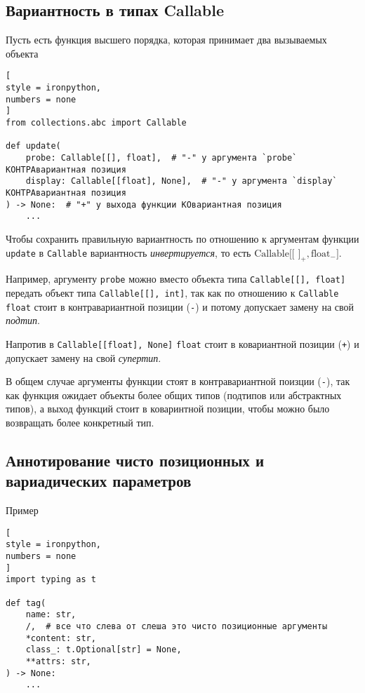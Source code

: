 \documentclass[%
	11pt,
	a4paper,
	utf8,
		]{article}
\begin{document}
\subsection{Вариантность в типах Callable}

Пусть есть функция высшего порядка, которая принимает два вызываемых объекта
\begin{lstlisting}[
style = ironpython,
numbers = none
]
from collections.abc import Callable

def update(
    probe: Callable[[], float],  # "-" у аргумента `probe` КОНТРАвариантная позиция
    display: Callable[[float], None],  # "-" у аргумента `display` КОНТРАвариантная позиция
) -> None:  # "+" у выхода функции КОвариантная позиция
    ...
\end{lstlisting}

Чтобы сохранить правильную вариантность по отношению к аргументам функции \verb*|update| в \verb*|Callable| вариантность \emph{инвертируется}, то есть $\text{Callable[[\ ]}_+, \text{float}_{-}]$.

Например, аргументу \verb*|probe| можно вместо объекта типа \verb|Callable[[], float]| передать объект типа \verb|Callable[[], int]|, так как по отношению к \verb*|Callable| \verb*|float| стоит в контравариантной позиции (\texttt{-}) и потому допускает замену на свой \emph{подтип}.

Напротив в \verb|Callable[[float], None]| \verb*|float| стоит в ковариантной позиции (\texttt{+}) и допускает замену на свой \emph{супертип}.

В общем случае аргументы функции стоят в контравариантной поизции (\texttt{-}), так как функция ожидает объекты более общих типов (подтипов или абстрактных типов), а выход функций стоит в коваринтной позиции, чтобы можно было возвращать более конкретный тип.

\subsection{Аннотирование чисто позиционных и вариадических параметров}

Пример
\begin{lstlisting}[
style = ironpython,
numbers = none
]
import typing as t

def tag(
    name: str,
    /,  # все что слева от слеша это чисто позиционные аргументы
    *content: str,
    class_: t.Optional[str] = None,
    **attrs: str,
) -> None:
    ...
\end{lstlisting}
\end{document}
